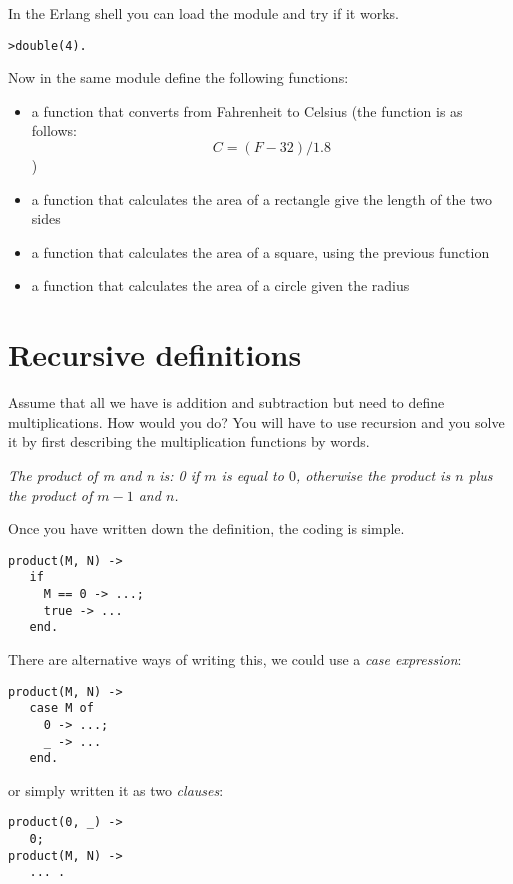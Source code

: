 \documentclass[a4paper,11pt]{article}
\begin{document}
In the Erlang shell you can load the module and try if it works.

\begin{verbatim}
>double(4).
\end{verbatim}

Now in the same module define the following functions:

\begin{itemize}
\item a function that converts from Fahrenheit to Celsius (the
  function is as follows:$$C = (F-32)/1.8$$)

\item a function that calculates the area of a rectangle give the
  length of the two sides

\item a function that calculates the area of a square, using the
  previous function

\item a function that calculates the area of a circle given the radius
\end{itemize} 

\section{Recursive definitions}

Assume that all we have is addition and subtraction but need to define
multiplications. How would you do? You will have to use recursion and
you solve it by first describing the multiplication functions by words.

{\em The product of m and n is: 0 if $m$ is equal to $0$, otherwise the
  product is $n$ plus the product of $m-1$ and $n$.}

Once you have written down the definition, the coding is simple.

\begin{verbatim}
product(M, N) -> 
   if 
     M == 0 -> ...;
     true -> ...
   end.
\end{verbatim}

There are alternative ways of writing this, we could use a {\em case
  expression}:

\begin{verbatim}
product(M, N) -> 
   case M of 
     0 -> ...;
     _ -> ...
   end.
\end{verbatim}

or simply written it as two {\em clauses}:

\begin{verbatim}
product(0, _) -> 
   0;
product(M, N) -> 
   ... .
\end{verbatim}
\end{document}
